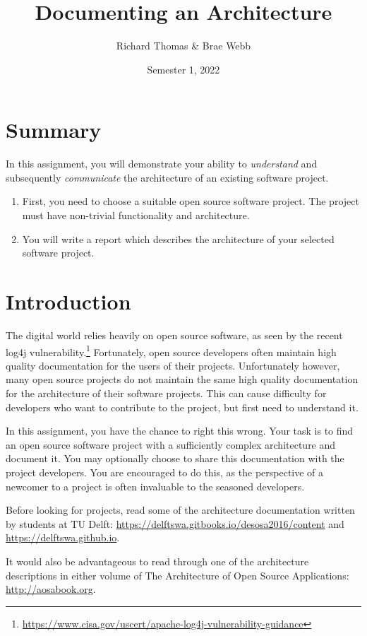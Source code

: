 \documentclass{csse4400}
\title{Documenting an Architecture}
\author{Richard Thomas \& Brae Webb}
\date{Semester 1, 2022}
\begin{document}
\maketitle

\section*{Summary}
In this assignment, you will demonstrate your ability to \textsl{understand}
and subsequently \textsl{communicate} the architecture of an existing software project.
\begin{enumerate}
    \item First, you need to choose a suitable open source software project.
             The project must have non-trivial functionality and architecture.
    \item You will write a report which describes the architecture of your selected software project.
\end{enumerate}


\section{Introduction}
The digital world relies heavily on open source software, as seen by the recent log4j vulnerability.\footnote{\url{https://www.cisa.gov/uscert/apache-log4j-vulnerability-guidance}}
Fortunately, open source developers often maintain high quality documentation for the users of their projects.
Unfortunately however, many open source projects do not maintain the same high quality documentation for the architecture of their software projects.
This can cause difficulty for developers who want to contribute to the project, but first need to understand it.

In this assignment, you have the chance to right this wrong.
Your task is to find an open source software project with a sufficiently complex architecture and document it.
You may optionally choose to share this documentation with the project developers.
You are encouraged to do this, as the perspective of a newcomer to a project is often invaluable to the seasoned developers.

Before looking for projects, read some of the architecture documentation written by students at TU Delft:
\url{https://delftswa.gitbooks.io/desosa2016/content} and \url{https://delftswa.github.io}.

It would also be advantageous to read through one of the architecture descriptions in either volume of
The Architecture of Open Source Applications: \url{http://aosabook.org}.
\end{document}
